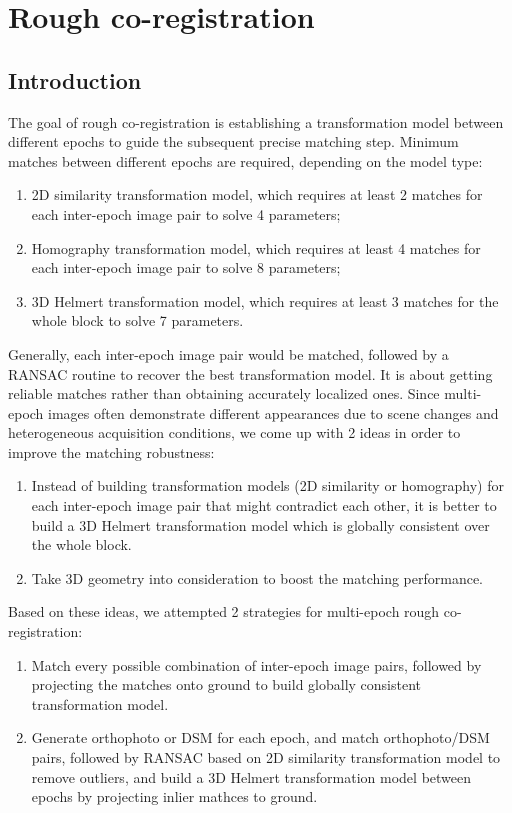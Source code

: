 
\chapter{Rough co-registration}
\label{chap:intro}
\minitoc

\section{Introduction}
The goal of rough co-registration is establishing a transformation model between different epochs to guide the subsequent precise matching step. Minimum matches between different epochs are required, depending on the model type:\\
\begin{enumerate}
    \item 2D similarity transformation model, which requires at least 2 matches for each inter-epoch image pair to solve 4 parameters;
    \item Homography transformation model, which requires at least 4 matches for each inter-epoch image pair to solve 8 parameters;
    \item 3D Helmert transformation model, which requires at least 3 matches for the whole block to solve 7 parameters.
\end{enumerate}
Generally, each inter-epoch image pair would be matched, followed by a RANSAC routine to recover the best transformation model.
It is about getting reliable matches rather than obtaining accurately localized ones.
Since multi-epoch images often demonstrate different appearances due to scene changes and heterogeneous acquisition conditions, we come up with 2 ideas in order to improve the matching robustness:\\
\begin{enumerate}
    \item Instead of building transformation models (2D similarity or homography) for each inter-epoch image pair that might contradict each other, it is better to build a 3D Helmert transformation model which is globally consistent over the whole block.
    \item Take 3D geometry into consideration to boost the matching performance.
\end{enumerate}
Based on these ideas, we attempted 2 strategies for multi-epoch rough co-registration:\\
\begin{enumerate}
    \item Match every possible combination of inter-epoch image pairs, followed by projecting the matches onto ground to build globally consistent transformation model.
    \item Generate orthophoto or DSM for each epoch, and match orthophoto/DSM pairs, followed by RANSAC based on 2D similarity transformation model to remove outliers, and build a 3D Helmert transformation model between epochs by projecting inlier mathces to ground.
\end{enumerate}

